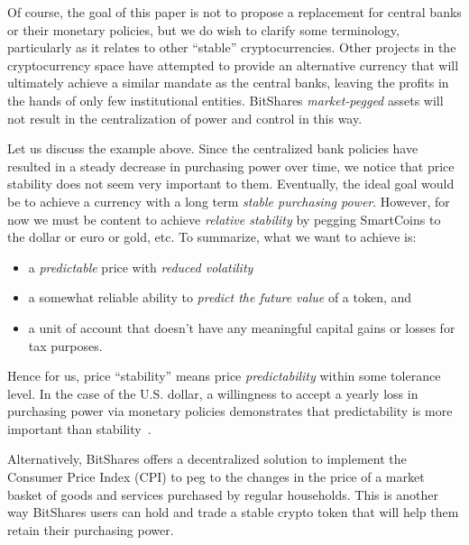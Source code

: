 Of course, the goal of this paper is not to propose a replacement for central
banks or their monetary policies, but we do wish to clarify some terminology,
particularly as it relates to other ``stable'' cryptocurrencies. Other projects
in the cryptocurrency space have attempted to provide an alternative currency
that will ultimately achieve a similar mandate as the central banks, leaving
the profits in the hands of only few institutional entities. BitShares
\emph{market-pegged} assets will not result in the centralization of power and
control in this way.

Let us discuss the example above. Since the centralized bank policies have
resulted in a steady decrease in purchasing power over time, we notice that
price stability does not seem very important to them. Eventually, the ideal
goal would be to achieve a currency with a long term \emph{stable purchasing
power}. However, for now we must be content to achieve \emph{relative
stability} by pegging SmartCoins to the dollar or euro or gold, etc. To
summarize, what we want to achieve is:
\begin{itemize}
 \item a \emph{predictable} price with \emph{reduced volatility}
 \item a somewhat reliable ability to \emph{predict the future value} of a token, and
 \item a unit of account that doesn't have any meaningful capital gains or
       losses for tax purposes.
\end{itemize}

Hence for us, price ``stability'' means price \emph{predictability} within some
tolerance level. In the case of the U.S. dollar, a willingness to accept a
yearly loss in purchasing power via monetary policies demonstrates that
predictability is more important than stability~\cite{bm:stable:impossible}.

Alternatively, BitShares offers a decentralized solution to implement the
Consumer Price Index (CPI) to peg to the changes in the price of a market
basket of goods and services purchased by regular households. This is another
way BitShares users can hold and trade a stable crypto token that will help
them retain their purchasing power.
